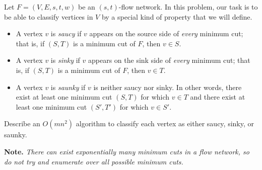 \documentclass{article}
\begin{document}
\begin{question}
Let $F = (V, E, s, t, w)$ be an $(s, t)$-flow network. In this problem, our task is to be able to classify vertices in $V$ by a special kind of property that we will define.

\begin{itemize}
    \item A vertex $v$ is {\em saucy} if $v$ appears on the source side of {\em every} minimum cut; that is, if $(S, T)$ is a minimum cut of $F$, then $v \in S$.

    \item A vertex $v$ is {\em sinky} if $v$ appears on the sink side of {\em every} minimum cut; that is, if $(S, T)$ is a minimum cut of $F$, then $v \in T$.

    \item A vertex $v$ is {\em saunky} if $v$ is neither saucy nor sinky. In other words, there exist at least one minimum cut $(S, T)$ for which $v \in T$ and there exist at least one minimum cut $(S', T')$ for which $v \in S'$.
\end{itemize}

Describe an $O(mn^2)$ algorithm to classify each vertex as either saucy, sinky, or saunky.

{\bfseries Note.} {\em There can exist exponentially many minimum cuts in a flow network, so do not try and enumerate over all possible minimum cuts.}
\end{question}
\end{document}
